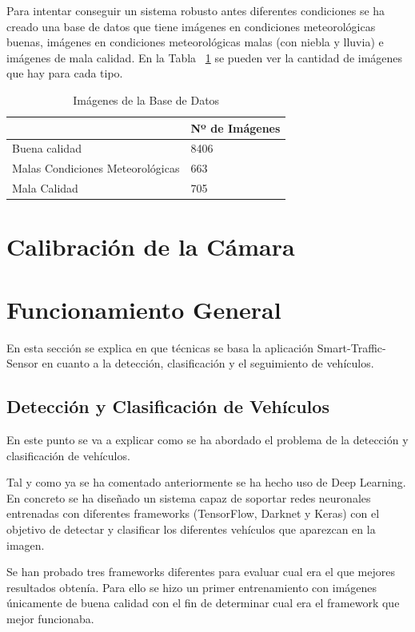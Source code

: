 Para intentar conseguir un sistema robusto antes diferentes condiciones se ha creado una base de datos que tiene imágenes en condiciones meteorológicas buenas, imágenes en condiciones meteorológicas malas (con niebla y lluvia) e imágenes de mala calidad. En la Tabla ~\ref{tabla_img_base_datos} se pueden ver la cantidad de imágenes que hay para cada tipo.
\begin{table}[htb]
\begin{center}
\begin{tabular}{|l|l|}
\hline
\cline{2-2}& Nº de Imágenes\\
\hline \hline
Buena calidad & 8406 \\ \hline
Malas Condiciones Meteorológicas & 663\\ \hline
Mala Calidad & 705\\ \hline
\end{tabular}
\caption{Imágenes de la Base de Datos}
\label{tabla_img_base_datos}
\end{center}
\end{table}

\section{Calibración de la Cámara}


\section{Funcionamiento General}

En esta sección se explica en que técnicas se basa la aplicación Smart-Traffic-Sensor en cuanto a la detección, clasificación y el seguimiento de vehículos.

\subsection{Detección y Clasificación de Vehículos}

En este punto se va a explicar como se ha abordado el problema de la detección y clasificación de vehículos.

Tal y como ya se ha comentado anteriormente se ha hecho uso de Deep Learning. En concreto se ha diseñado un sistema capaz de soportar redes neuronales entrenadas con diferentes frameworks (TensorFlow, Darknet y Keras) con el objetivo de detectar y clasificar los diferentes vehículos que aparezcan en la imagen.

Se han probado tres frameworks diferentes para evaluar cual era el que mejores resultados obtenía. Para ello se hizo un primer entrenamiento con imágenes únicamente de buena calidad con el fin de determinar cual era el framework que mejor funcionaba.

